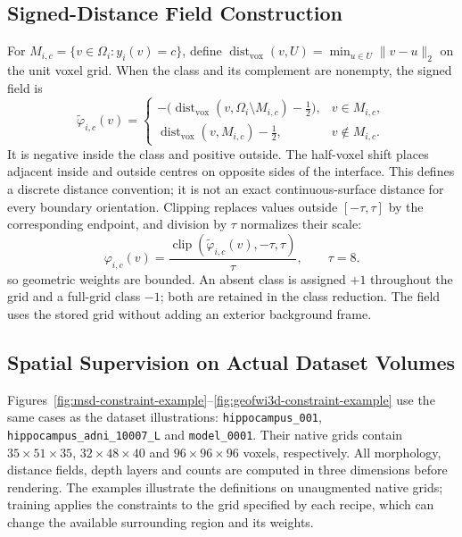 \documentclass[12pt,a4paper]{article}
\begin{document}
\subsection{Signed-Distance Field Construction}
\label{sec:sdf-construction-details}

For $M_{i,c}=\{v\in\Omega_i:y_i(v)=c\}$, define
$\operatorname{dist}_{\mathrm{vox}}(v,U)=\min_{u\in U}\|v-u\|_2$
on the unit voxel grid. When the class and its complement are nonempty,
the signed field is
\begin{equation}
\widetilde\varphi_{i,c}(v)=
\begin{cases}
-\bigl(\operatorname{dist}_{\mathrm{vox}}
       (v,\Omega_i\setminus M_{i,c})-\tfrac12\bigr),
   &v\in M_{i,c},\\[0.4em]
\operatorname{dist}_{\mathrm{vox}}(v,M_{i,c})-\tfrac12,
   &v\notin M_{i,c}.
\end{cases}
\label{eq:sdf-half-voxel-field}
\end{equation}
It is negative inside the class and positive outside. The half-voxel
shift places adjacent inside and outside centres on opposite sides of
the interface. This defines a discrete distance convention; it is not
an exact continuous-surface distance for every boundary orientation.
Clipping replaces values outside $[-\tau,\tau]$ by the corresponding
endpoint, and division by $\tau$ normalizes their scale:
\begin{equation}
\varphi_{i,c}(v)
=\frac{\operatorname{clip}
  (\widetilde\varphi_{i,c}(v),-\tau,\tau)}{\tau},
\qquad \tau=8.
\label{eq:sdf-clipped-normalized-field}
\end{equation}
so geometric weights are bounded. An absent class is assigned $+1$
throughout the grid and a full-grid class $-1$; both are retained in
the class reduction. The field uses the stored grid without adding an
exterior background frame.


\subsection{Spatial Supervision on Actual Dataset Volumes}
\label{sec:dataset-constraint-examples}

Figures~\ref{fig:msd-constraint-example}--\ref{fig:geofwi3d-constraint-example}
use the same cases as the dataset illustrations: \texttt{hippocampus\_001},
\texttt{hippocampus\_adni\_10007\_L} and \texttt{model\_0001}.
Their native grids contain $35\times51\times35$, $32\times48\times40$
and $96\times96\times96$ voxels, respectively. All morphology, distance
fields, depth layers and counts are computed in three dimensions before
rendering. The examples illustrate the definitions on unaugmented native
grids; training applies the constraints to the grid specified by each
recipe, which can change the available surrounding region and its weights.
\end{document}
